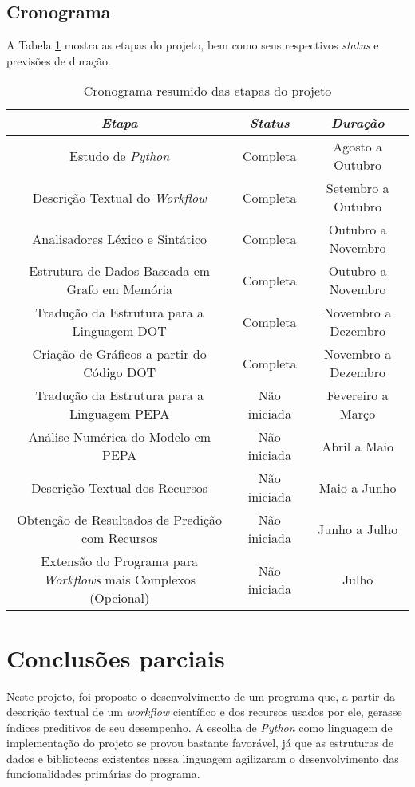 \documentclass[a4paper,11pt]{article}
\begin{document}
 	\newpage
  	\subsection{Cronograma}
  		A Tabela \ref{tab:cronograma} mostra as etapas do projeto, bem como seus respectivos \emph{status} e previsões de duração.

  	\begin{table}[ht]
  		\centering
  		\begin{tabular}{ccc}
  			\emph{Etapa} & \emph{Status} & \emph{Duração}\\ 
  			\hline 
  			Estudo de \emph{Python} & Completa & Agosto a Outubro \\
  			Descrição Textual do \emph{Workflow} & Completa & Setembro a Outubro \\
  			Analisadores Léxico e Sintático & Completa & Outubro a Novembro \\
  			Estrutura de Dados Baseada em Grafo em Memória & Completa & Outubro a Novembro \\
  			Tradução da Estrutura para a Linguagem DOT & Completa & Novembro a Dezembro\\
  			Criação de Gráficos a partir do Código DOT & Completa & Novembro a Dezembro\\
  			Tradução da Estrutura para a Linguagem PEPA & Não iniciada & Fevereiro a Março\\
  			Análise Numérica do Modelo em PEPA & Não iniciada & Abril a Maio \\
  			Descrição Textual dos Recursos & Não iniciada & Maio a Junho \\
  			Obtenção de Resultados de Predição com Recursos & Não iniciada & Junho a Julho \\
  			Extensão do Programa para \emph{Workflows} mais Complexos (Opcional) & Não iniciada & Julho \\
  			\hline
  		\end{tabular}
  		\caption{Cronograma resumido das etapas do projeto}
  		\label{tab:cronograma}
  	\end{table}

  \section{Conclusões parciais}
  	Neste projeto, foi proposto o desenvolvimento de um programa que, a partir da descrição textual de um \emph{workflow} científico e dos recursos usados por ele, gerasse índices preditivos de seu desempenho. A escolha de \emph{Python} como linguagem de implementação do projeto se provou bastante favorável, já que as estruturas de dados e bibliotecas existentes nessa linguagem agilizaram o desenvolvimento das funcionalidades primárias do programa.
\end{document}
